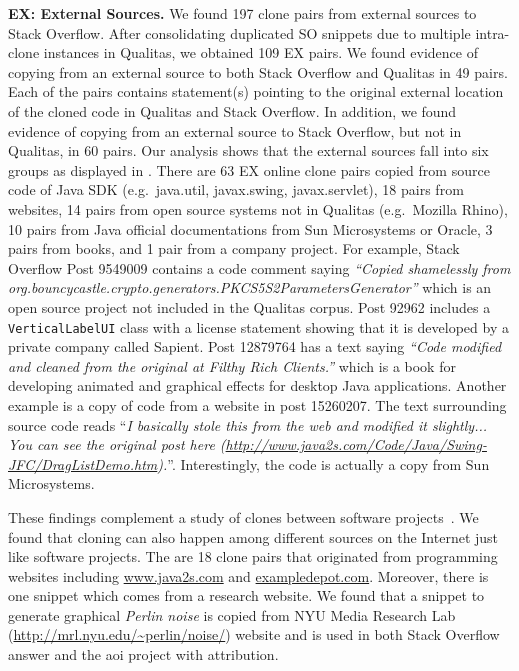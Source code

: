 \documentclass[10pt,journal,compsoc]{IEEEtran}
\begin{document}
\textbf{EX: External Sources.} We found 197 clone pairs from external sources to
Stack Overflow. After consolidating duplicated SO snippets due to multiple
intra-clone instances in Qualitas, we obtained 109 EX pairs. We found
evidence of copying from an external source to both Stack
Overflow and Qualitas in 49 pairs. Each of the pairs contains
statement(s) pointing to the original external location of the cloned
code in Qualitas and Stack Overflow. In addition, we found evidence
of copying from an external source to Stack Overflow, but not in
Qualitas, in 60 pairs. 
Our
analysis shows that the external sources fall into six groups as displayed in
. There are 63 EX online clone pairs copied
from source code of Java SDK (e.g.\ \textsf{java.util}, \textsf{javax.swing}, \textsf{javax.servlet}), 
18 pairs from websites, 14 pairs from open
source systems not in Qualitas (e.g.\ \textsf{Mozilla
	Rhino}), 10 pairs from Java official documentations from Sun
Microsystems or Oracle, 3 pairs from books, and 1 pair from a company
project. For example, Stack Overflow Post 9549009 contains a code comment saying
\textit{``Copied shamelessly from
	org.bouncycastle.crypto.generators.PKCS5S2ParametersGenerator''} which is an
open source project not included in the Qualitas corpus. Post 92962 includes a {\small\texttt{VerticalLabelUI}}
class with a license statement showing that it is developed by a private company
called \textsf{Sapient}. Post 12879764 has a text saying \textit{``Code modified
	and cleaned from the original at Filthy Rich Clients.''} which is a book for
developing animated and graphical effects for desktop Java applications. Another
example is a copy of code from a website in post 15260207. The text surrounding
source code reads ``\textit{I basically stole this from the web and modified it
	slightly... You can see the original post here
	(\url{http://www.java2s.com/Code/Java/Swing-JFC/DragListDemo.htm}).}''.
Interestingly, the code is actually a copy from Sun Microsystems.

These findings complement a study of clones between software
projects~\cite{Svajlenko2014}. We found that cloning can also happen among
different sources on the Internet just like software projects. The are 18 clone
pairs that originated from programming websites including \url{www.java2s.com}
and \url{exampledepot.com}. Moreover, there is one snippet which comes from a
research website. We found that a snippet to generate graphical \textit{Perlin
	noise} is copied from NYU Media Research Lab
(\url{http://mrl.nyu.edu/~perlin/noise/}) website and is used in both Stack Overflow
answer and the \textsf{aoi} project with attribution. 
\end{document}
